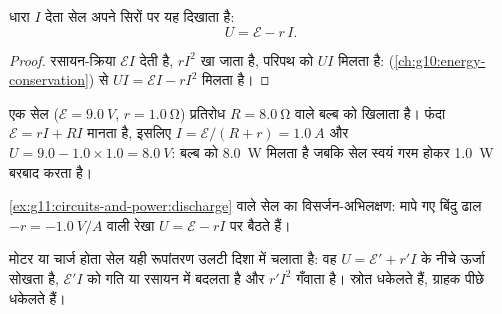 \begin{proposition}[सिरों का विभवांतर]\label{prop:g11:circuits-and-power:terminal}
धारा $I$ देता सेल अपने सिरों पर यह दिखाता है:
\[ U = \mathcal{E} - r\,I . \]
\end{proposition}

\begin{proof}
रसायन-क्रिया $\mathcal{E}I$ देती है,  $rI^2$ खा जाता है,
परिपथ को $UI$ मिलता है:  (\cref{ch:g10:energy-conservation}) से $UI = \mathcal{E}I - rI^2$ मिलता
है।
\end{proof}

\begin{example}[भार के नीचे एक सेल]\label{ex:g11:circuits-and-power:discharge}
एक सेल ($\mathcal{E} = \qty{9.0}{V}$, $r = \qty{1.0}{\ohm}$) प्रतिरोध $R = \qty{8.0}{\ohm}$ वाले बल्ब को खिलाता है।
फंदा $\mathcal{E} =
rI + RI$ मानता है, इसलिए $I = \mathcal{E}/(R + r) = \qty{1.0}{A}$ और $U = 9.0 -
1.0 \times 1.0 = \qty{8.0}{V}$: बल्ब को \qty{8.0}{W} मिलता है
जबकि सेल स्वयं गरम होकर \qty{1.0}{W} बरबाद करता है।
\end{example}

\begin{omfigure}

{\small \cref{ex:g11:circuits-and-power:discharge} वाले सेल का विसर्जन-अभिलक्षण: मापे गए बिंदु ढाल $-r = \qty{-1.0}{V/A}$ वाली
रेखा $U = \mathcal{E} - rI$ पर बैठते हैं।}
\end{omfigure}

\begin{remark}[ग्राहक]\label{rem:g11:circuits-and-power:receivers}
मोटर या चार्ज होता सेल यही रूपांतरण उलटी दिशा में चलाता है: वह $U = \mathcal{E}' + r'I$ के
नीचे ऊर्जा सोखता है, $\mathcal{E}'I$ को गति या रसायन में बदलता है और $r'I^2$ गँवाता
है। स्रोत धकेलते हैं, ग्राहक पीछे धकेलते हैं।
\end{remark}

